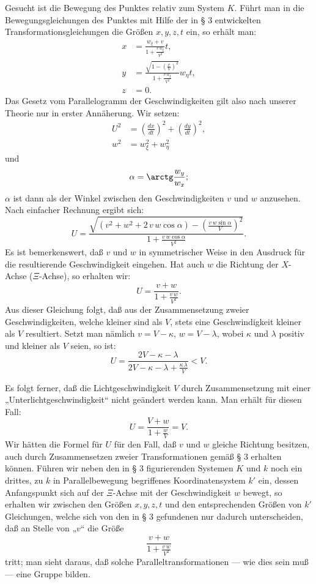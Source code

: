 \documentclass[17pt]{webarticle}       %
\begin{document}
Gesucht ist die Bewegung des Punktes relativ zum System \( K \). Führt man in die Bewegungsgleichungen des Punktes mit Hilfe der in § 3 entwickelten Transformationsgleichungen die Größen \( x, y, z, t \) ein, so erhält man:
\[
\begin{aligned}
x &= \frac{w_\xi + v}{1 + \frac{v \, w_\xi}{V^2}} t,
\\
y &= \frac{\sqrt{1 - \left( \frac{v}{V} \right)^2}}{1 + \frac{v \, w_\xi}{V^2}} w_\eta t,
\\
z &= 0.
\end{aligned}
\]
Das Gesetz vom Parallelogramm der Geschwindigkeiten gilt also nach unserer Theorie nur in erster Annäherung. Wir setzen:
\[
\begin{aligned}
U^2 &= \left( \frac{dx}{dt} \right)^2 + \left( \frac{dy}{dt} \right)^2,
\\
w^2 &= w_\xi^2 + w_\eta^2
\end{aligned}
\]
und
\[
\alpha = \arctg \frac{w_y}{w_x};
\]
\(\alpha\) ist dann als der Winkel zwischen den Geschwindigkeiten \( v \) und \( w \) anzusehen. Nach einfacher Rechnung ergibt sich:
\[
U = \frac{\sqrt{(v^2 + w^2 + 2  \,  v \, w \cos \alpha) - \left( \frac{v \, w \sin \alpha}{V} \right)^2}}{1 + \frac{v \, w \cos \alpha}{V^2}}.
\]
Es ist bemerkenswert, daß \( v \) und \( w \) in symmetrischer Weise in den Ausdruck für die resultierende Geschwindigkeit eingehen. Hat auch \( w \) die Richtung der \( X \)-Achse (\( \Xi \)-Achse), so erhalten wir:
\[
U = \frac{v + w}{1 + \frac{v \, w}{V^2}}.
\]
Aus dieser Gleichung folgt, daß aus der Zusammensetzung zweier Geschwindigkeiten, welche kleiner sind als \( V \), stets eine Geschwindigkeit kleiner als \( V \) resultiert. Setzt man nämlich \( v = V - \kappa \), \( w = V - \lambda \), wobei \( \kappa \) und \( \lambda \) positiv und kleiner als \( V \) seien, so ist:
\[
U = \frac{2V - \kappa - \lambda}{2V - \kappa - \lambda + \frac{\kappa \, \lambda}{V}} < V.
\]

Es folgt ferner, daß die Lichtgeschwindigkeit \( V \) durch Zusammensetzung mit einer „Unterlichtgeschwindigkeit“ nicht geändert werden kann. Man erhält für diesen Fall:
\[
U = \frac{V + w}{1 + \frac{w}{V}} = V.
\]
Wir hätten die Formel für \( U \) für den Fall, daß \( v \) und \( w \) gleiche Richtung besitzen, auch durch Zusammensetzen zweier Transformationen gemäß § 3 erhalten können. Führen wir neben den in § 3 figurierenden Systemen \( K \) und \( k \) noch ein drittes, zu \( k \) in Parallelbewegung begriffenes Koordinatensystem \( k' \) ein, dessen Anfangspunkt sich auf der \( \Xi \)-Achse mit der Geschwindigkeit \( w \) bewegt, so erhalten wir zwischen den Größen \( x, y, z, t \) und den entsprechenden Größen von \( k' \) Gleichungen, welche sich von den in § 3 gefundenen nur dadurch unterscheiden, daß an Stelle von „\( v \)“ die Größe
\[
\frac{v + w}{1 + \frac{v \, w}{V^2}}
\]
tritt; man sieht daraus, daß solche Paralleltransformationen — wie dies sein muß — eine Gruppe bilden.
\end{document}
